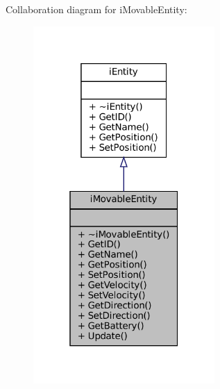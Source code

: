 Collaboration diagram for i\+Movable\+Entity\+:\nopagebreak
\begin{figure}[H]
\begin{center}
\leavevmode
\includegraphics[width=196pt]{classiMovableEntity__coll__graph}
\end{center}
\end{figure}

